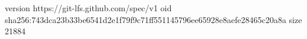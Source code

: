 version https://git-lfs.github.com/spec/v1
oid sha256:743dca23b33be6541d2e1f79f9c71ff551145796ee65928e8aefe28465c20a8a
size 21884
